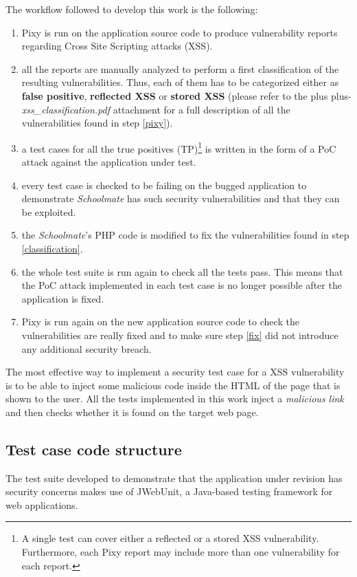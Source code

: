 \documentclass{sig-alternate-05-2015}
\newcommand\lword[1]{\leavevmode\nobreak\hskip0pt plus\linewidth\penalty50\hskip0pt plus-\linewidth\nobreak#1}
\begin{document}
The workflow followed to develop this work is the following:
\begin{enumerate}
    \item \label{pixy} Pixy is run on the application source code to produce vulnerability reports
        regarding Cross Site Scripting attacks (XSS).
    \item \label{classification} all the reports are manually analyzed to perform a first
        classification of the resulting vulnerabilities. Thus, each of them has to be
        categorized either as \textbf{false positive}, \textbf{reflected XSS} or
        \textbf{stored XSS} (please refer to the \lword{\emph{xss\_classification.pdf}}
        attachment for a full description of all the vulnerabilities found in step \ref{pixy}).
    \item a test cases for all the true positives (TP)\footnote{A single test can cover
        either a reflected or a stored XSS vulnerability. Furthermore, each Pixy report may
        include more than one vulnerability for each report.} is written in the form
        of a PoC attack against the application under test.
    \item every test case is checked to be failing on the bugged application to demonstrate
        \emph{Schoolmate} has such security vulnerabilities and that they can be exploited.
    \item \label{fix} the \emph{Schoolmate}'s PHP code is modified to fix the vulnerabilities
        found in step \ref{classification}.
    \item the whole test suite is run again to check all the tests pass. This means that
        the PoC attack implemented in each test case is no longer possible after the application
        is fixed.
    \item Pixy is run again on the new application source code to check the
        vulnerabilities are really fixed and to make sure step \ref{fix} did not
        introduce any additional security breach.
\end{enumerate}

The most effective way to implement a security test case for a XSS vulnerability is to
be able to inject some malicious code inside the HTML of the page that is shown to the user.
All the tests implemented in this work inject a \emph{malicious link} and then checks
whether it is found on the target web page.

\subsection{Test case code structure}
The test suite developed to demonstrate that the application under revision has
security concerns makes use of JWebUnit, a Java-based testing framework for web
applications.
\end{document}
